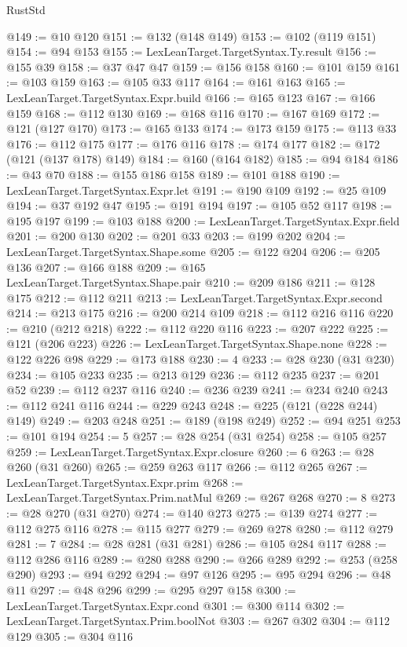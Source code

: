 \begin{lexlean}{RustStd}
\begin{coremodule}
{\begin{coremodule}
{{{{{{{{{{{{{{{{{{{{{{{{{{{{{{{{{{{{{{{{{{{{@149 := @10 @120
@151 := @132 (@148 @149)
@153 := @102 (@119 @151)
@154 := @94 @153
@155 := LexLeanTarget.TargetSyntax.Ty.result
@156 := @155 @39
@158 := @37 @47 @47
@159 := @156 @158
@160 := @101 @159
@161 := @103 @159
@163 := @105 @33 @117
@164 := @161 @163
@165 := LexLeanTarget.TargetSyntax.Expr.build
@166 := @165 @123
@167 := @166 @159
@168 := @112 @130
@169 := @168 @116
@170 := @167 @169
@172 := @121 (@127 @170)
@173 := @165 @133
@174 := @173 @159
@175 := @113 @33
@176 := @112 @175
@177 := @176 @116
@178 := @174 @177
@182 := @172 (@121 (@137 @178) @149)
@184 := @160 (@164 @182)
@185 := @94 @184
@186 := @43 @70
@188 := @155 @186 @158
@189 := @101 @188
@190 := LexLeanTarget.TargetSyntax.Expr.let
@191 := @190 @109
@192 := @25 @109
@194 := @37 @192 @47
@195 := @191 @194
@197 := @105 @52 @117
@198 := @195 @197
@199 := @103 @188
@200 := LexLeanTarget.TargetSyntax.Expr.field
@201 := @200 @130
@202 := @201 @33
@203 := @199 @202
@204 := LexLeanTarget.TargetSyntax.Shape.some
@205 := @122 @204
@206 := @205 @136
@207 := @166 @188
@209 := @165 LexLeanTarget.TargetSyntax.Shape.pair
@210 := @209 @186
@211 := @128 @175
@212 := @112 @211
@213 := LexLeanTarget.TargetSyntax.Expr.second
@214 := @213 @175
@216 := @200 @214 @109
@218 := @112 @216 @116
@220 := @210 (@212 @218)
@222 := @112 @220 @116
@223 := @207 @222
@225 := @121 (@206 @223)
@226 := LexLeanTarget.TargetSyntax.Shape.none
@228 := @122 @226 @98
@229 := @173 @188
@230 := 4
@233 := @28 @230 (@31 @230)
@234 := @105 @233
@235 := @213 @129
@236 := @112 @235
@237 := @201 @52
@239 := @112 @237 @116
@240 := @236 @239
@241 := @234 @240
@243 := @112 @241 @116
@244 := @229 @243
@248 := @225 (@121 (@228 @244) @149)
@249 := @203 @248
@251 := @189 (@198 @249)
@252 := @94 @251
@253 := @101 @194
@254 := 5
@257 := @28 @254 (@31 @254)
@258 := @105 @257
@259 := LexLeanTarget.TargetSyntax.Expr.closure
@260 := 6
@263 := @28 @260 (@31 @260)
@265 := @259 @263 @117
@266 := @112 @265
@267 := LexLeanTarget.TargetSyntax.Expr.prim
@268 := LexLeanTarget.TargetSyntax.Prim.natMul
@269 := @267 @268
@270 := 8
@273 := @28 @270 (@31 @270)
@274 := @140 @273
@275 := @139 @274
@277 := @112 @275 @116
@278 := @115 @277
@279 := @269 @278
@280 := @112 @279
@281 := 7
@284 := @28 @281 (@31 @281)
@286 := @105 @284 @117
@288 := @112 @286 @116
@289 := @280 @288
@290 := @266 @289
@292 := @253 (@258 @290)
@293 := @94 @292
@294 := @97 @126
@295 := @95 @294
@296 := @48 @11
@297 := @48 @296
@299 := @295 @297 @158
@300 := LexLeanTarget.TargetSyntax.Expr.cond
@301 := @300 @114
@302 := LexLeanTarget.TargetSyntax.Prim.boolNot
@303 := @267 @302
@304 := @112 @129
@305 := @304 @116
}}}}}}}}}}}}}}}}}}}}}}}}}}}}}}}}}}}}}}}}}}}}
\end{coremodule}}
\end{coremodule}
\end{lexlean}
